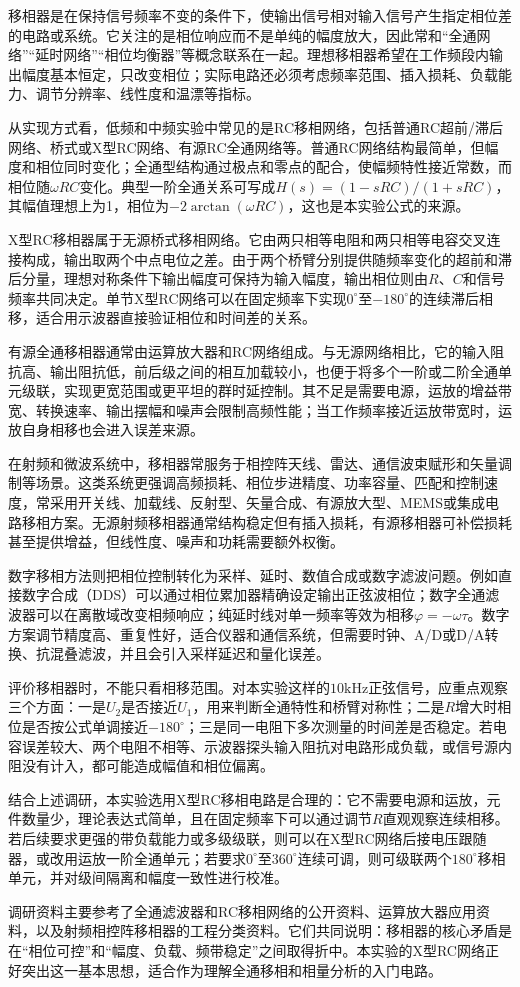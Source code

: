\documentclass{eleclab-report}
\newcommand{\AnalysisParagraph}[1]{\par\hspace*{2em}#1\par}
\begin{document}
\makelabtitle
\makelabheadertable

\AnalysisParagraph{移相器是在保持信号频率不变的条件下，使输出信号相对输入信号产生指定相位差的电路或系统。它关注的是相位响应而不是单纯的幅度放大，因此常和“全通网络”“延时网络”“相位均衡器”等概念联系在一起。理想移相器希望在工作频段内输出幅度基本恒定，只改变相位；实际电路还必须考虑频率范围、插入损耗、负载能力、调节分辨率、线性度和温漂等指标。}
\AnalysisParagraph{从实现方式看，低频和中频实验中常见的是RC移相网络，包括普通RC超前/滞后网络、桥式或X型RC网络、有源RC全通网络等。普通RC网络结构最简单，但幅度和相位同时变化；全通型结构通过极点和零点的配合，使幅频特性接近常数，而相位随$\omega RC$变化。典型一阶全通关系可写成$H(s)=(1-sRC)/(1+sRC)$，其幅值理想上为1，相位为$-2\arctan(\omega RC)$，这也是本实验公式的来源。}
\AnalysisParagraph{X型RC移相器属于无源桥式移相网络。它由两只相等电阻和两只相等电容交叉连接构成，输出取两个中点电位之差。由于两个桥臂分别提供随频率变化的超前和滞后分量，理想对称条件下输出幅度可保持为输入幅度，输出相位则由$R$、$C$和信号频率共同决定。单节X型RC网络可以在固定频率下实现$0^\circ$至$-180^\circ$的连续滞后相移，适合用示波器直接验证相位和时间差的关系。}
\AnalysisParagraph{有源全通移相器通常由运算放大器和RC网络组成。与无源网络相比，它的输入阻抗高、输出阻抗低，前后级之间的相互加载较小，也便于将多个一阶或二阶全通单元级联，实现更宽范围或更平坦的群时延控制。其不足是需要电源，运放的增益带宽、转换速率、输出摆幅和噪声会限制高频性能；当工作频率接近运放带宽时，运放自身相移也会进入误差来源。}
\AnalysisParagraph{在射频和微波系统中，移相器常服务于相控阵天线、雷达、通信波束赋形和矢量调制等场景。这类系统更强调高频损耗、相位步进精度、功率容量、匹配和控制速度，常采用开关线、加载线、反射型、矢量合成、有源放大型、MEMS或集成电路移相方案。无源射频移相器通常结构稳定但有插入损耗，有源移相器可补偿损耗甚至提供增益，但线性度、噪声和功耗需要额外权衡。}
\AnalysisParagraph{数字移相方法则把相位控制转化为采样、延时、数值合成或数字滤波问题。例如直接数字合成（DDS）可以通过相位累加器精确设定输出正弦波相位；数字全通滤波器可以在离散域改变相频响应；纯延时线对单一频率等效为相移$\varphi=-\omega\tau$。数字方案调节精度高、重复性好，适合仪器和通信系统，但需要时钟、A/D或D/A转换、抗混叠滤波，并且会引入采样延迟和量化误差。}
\AnalysisParagraph{评价移相器时，不能只看相移范围。对本实验这样的$10\mathrm{kHz}$正弦信号，应重点观察三个方面：一是$U_2$是否接近$U_1$，用来判断全通特性和桥臂对称性；二是$R$增大时相位是否按公式单调接近$-180^\circ$；三是同一电阻下多次测量的时间差是否稳定。若电容误差较大、两个电阻不相等、示波器探头输入阻抗对电路形成负载，或信号源内阻没有计入，都可能造成幅值和相位偏离。}
\AnalysisParagraph{结合上述调研，本实验选用X型RC移相电路是合理的：它不需要电源和运放，元件数量少，理论表达式简单，且在固定频率下可以通过调节$R$直观观察连续相移。若后续要求更强的带负载能力或多级级联，则可以在X型RC网络后接电压跟随器，或改用运放一阶全通单元；若要求$0^\circ$至$360^\circ$连续可调，则可级联两个$180^\circ$移相单元，并对级间隔离和幅度一致性进行校准。}
\AnalysisParagraph{调研资料主要参考了全通滤波器和RC移相网络的公开资料、运算放大器应用资料，以及射频相控阵移相器的工程分类资料。它们共同说明：移相器的核心矛盾是在“相位可控”和“幅度、负载、频带稳定”之间取得折中。本实验的X型RC网络正好突出这一基本思想，适合作为理解全通移相和相量分析的入门电路。}
\end{document}
